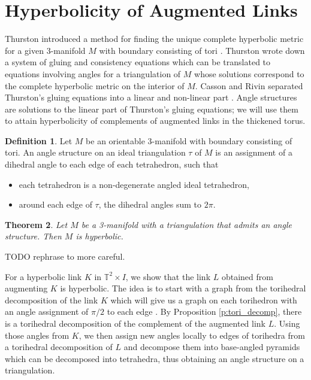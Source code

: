 \documentclass[11pt]{amsart}
\newcommand{\prpref}[1]{Proposition \ref{#1}}
\newcommand{\torus}{{\mathbb{T}^2}}
\theoremstyle{plain}
\newtheorem{theorem}{Theorem}[section]
\theoremstyle{definition}
\newtheorem{define}[theorem]{Definition}
\begin{document}
\section{Hyperbolicity of Augmented Links}
\label{s:hyperbolicity}
Thurston introduced a method for finding the
unique complete hyperbolic metric for a given 3-manifold $M$
with boundary consisting of tori \cite{Thurston}. 
Thurston wrote down a system of gluing and consistency equations
which can be translated to equations involving
angles for a triangulation of $M$ whose solutions correspond to the
complete hyperbolic metric on the interior of $M$.
Casson and Rivin separated Thurston's
gluing equations into a linear and non-linear part \cite{Casson-Rivin}.
Angle structures are solutions to the linear part of
Thurston's gluing equations;
we will use them to attain hyperbolicity of complements
of augmented links in the thickened torus.


\begin{define}
Let $M$ be an orientable 3-manifold with boundary consisting of tori. An angle
structure on an ideal triangulation $\tau$ of $M$ is an assignment of a dihedral
angle to each edge of each tetrahedron, such that
\begin{itemize}
\item each tetrahedron is a non-degenerate angled ideal tetrahedron,
\item around each edge of $\tau$, the dihedral angles sum to $2\pi$.
\end{itemize}
\end{define}



\begin{theorem}\cite[Theorem 1.1]{FG-angles}
\label{t:hyperbolic-angle-str}
Let $M$ be a 3-manifold with a triangulation that admits an angle structure.
Then $M$ is hyperbolic.
\end{theorem}


TODO rephrase to more careful.

For a hyperbolic link $K$ in $\torus \times I$, we show
that the link $L$ obtained from augmenting $K$ is hyperbolic.
The idea is to start with a graph from the torihedral decomposition
of the link $K$ which will give us a graph on each torihedron with an angle
assignment of $\pi/2$ to each edge \cite{CKP2}.
By \prpref{p:tori_decomp},
there is a torihedral decomposition of the complement of the augmented link $L$.
Using those angles from $K$,
we then assign new angles locally to edges of torihedra from a torihedral 
decomposition of $L$
and decompose them into base-angled pyramids which can be decomposed 
into tetrahedra, thus obtaining an angle structure on a triangulation.
\end{document}
